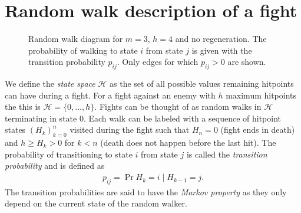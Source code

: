 \section{Random walk description of a fight}\label{chap:fightDef}
\begin{figure}\label{fig:randomWalk}
    \centering
    \caption{Random walk diagram for $m=3$, $h=4$ and no regeneration. The probability of walking to state $i$ from state $j$ is given with the transition probability $p_{ij}$. Only edges for which $p_{ij} > 0$ are shown.}
\end{figure}

We define the \textit{state space} $\mathcal{H}$ as the set of all possible values remaining hitpoints can have during a fight. For a fight against an enemy with $h$ maximum hitpoints the this is $\mathcal{H} = \{0,\ldots,h\}$. Fights can be thought of as random walks in $\mathcal{H}$ terminating in state 0. Each walk can be labeled with a sequence of hitpoint states $(H_k)_{k=0}^{n}$ visited during the fight such that $H_n=0$ (fight ends in death) and $h \geq H_k > 0$ for $k<n$ (death does not happen before the last hit).
The probability of transitioning to state $i$ from state $j$ is called the \textit{transition probability} and is defined as
\begin{align}\label{eq:transitionProbabilities}
    p_{ij} = \Pr{H_k = i \mid H_{k-1} = j}.
\end{align}
The transition probabilities are said to have the \textit{Markov property} as they only depend on the current state of the random walker.

